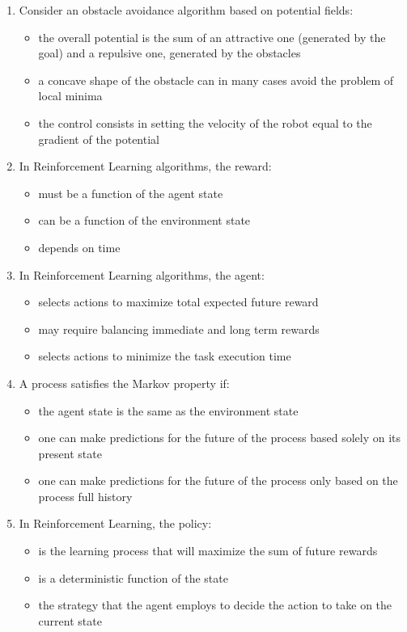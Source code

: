 \documentclass[openany]{book}
\theoremstyle{definition}
\theoremstyle{remark}
\begin{document}
\begin{enumerate}
    \item Consider an obstacle avoidance algorithm based on potential fields:
    \begin{itemize}
        \item[\checkmark] the overall potential is the sum of an attractive one (generated by the goal) and a repulsive one, generated by the obstacles
        \item[] a concave shape of the obstacle can in many cases avoid the problem of local minima
        \item[] the control consists in setting the velocity of the robot equal to the gradient of the potential
    \end{itemize}

    \item In Reinforcement Learning algorithms, the reward:
    \begin{itemize}
        \item[] must be a function of the agent state
        \item[\checkmark] can be a function of the environment state
        \item[] depends on time
    \end{itemize}

    \item In Reinforcement Learning algorithms, the agent:
    \begin{itemize}
        \item[\checkmark] selects actions to maximize total expected future reward
        \item[\checkmark] may require balancing immediate and long term rewards
        \item[] selects actions to minimize the task execution time
    \end{itemize}

    \item A process satisfies the Markov property if:
    \begin{itemize}
        \item[] the agent state is the same as the environment state
        \item[\checkmark] one can make predictions for the future of the process based solely on its present state
        \item[] one can make predictions for the future of the process only based on the process full history
    \end{itemize}

    \item In Reinforcement Learning, the policy:
    \begin{itemize}
        \item[] is the learning process that will maximize the sum of future rewards
        \item[] is a deterministic function of the state
        \item[\checkmark] the strategy that the agent employs to decide the action to take on the current state
    \end{itemize}


\end{enumerate}
\end{document}
